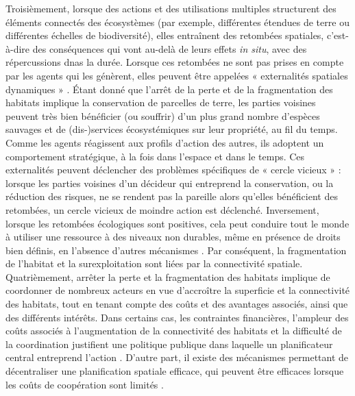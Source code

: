 Troisièmement, lorsque des actions et des utilisations multiples structurent des éléments connectés des écosystèmes (par exemple, différentes étendues de terre ou différentes échelles de biodiversité), elles entraînent des retombées spatiales, c'est-à-dire des conséquences qui vont au-delà de leurs effets \textit{in situ}, avec des répercussions dnas la durée. Lorsque ces retombées ne sont pas prises en compte par les agents qui les génèrent, elles peuvent être appelées « externalités spatiales dynamiques » \citep{sanchirico_bioeconomics_1999, costello_optimal_2008, costello_private_2017}. Étant donné que l'arrêt de la perte et de la fragmentation des habitats implique la conservation de parcelles de terre, les parties voisines peuvent très bien bénéficier (ou souffrir) d'un plus grand nombre d'espèces sauvages et de (dis-)services écosystémiques sur leur propriété, au fil du temps. Comme les agents réagissent aux profils d'action des autres, ils adoptent un comportement stratégique, à la fois dans l'espace et dans le temps. Ces externalités peuvent déclencher des problèmes spécifiques de « cercle vicieux » \citep{costello_private_2017} : lorsque les parties voisines d'un décideur qui entreprend la conservation, ou la réduction des risques, ne se rendent pas la pareille alors qu'elles bénéficient des retombées, un cercle vicieux de moindre action est déclenché. Inversement, lorsque les retombées écologiques sont positives, cela peut conduire tout le monde à utiliser une ressource à des niveaux non durables, même en présence de droits bien définis, en l'absence d'autres mécanismes \citep{janmaat_sharing_2005,kaffine_unitization_2010}.  Par conséquent, la fragmentation de l'habitat et la surexploitation sont liées par la connectivité spatiale. 
\\
Quatrièmement, arrêter la perte et la fragmentation des habitats implique de coordonner de nombreux acteurs en vue d'accroître la superficie et la connectivité des habitats, tout en tenant compte des coûts et des avantages associés, ainsi que des différents intérêts.
Dans certains cas, les contraintes financières, l'ampleur des coûts associés à l'augmentation de la connectivité des habitats et la difficulté de la coordination justifient une politique publique dans laquelle un planificateur central entreprend l'action \citep{Mouysset2012}. D'autre part, il existe des mécanismes permettant de décentraliser une planification spatiale efficace, qui peuvent être efficaces lorsque les coûts de coopération sont limités \citep{costello_private_2017, bareille_agglomeration_2023}. 

